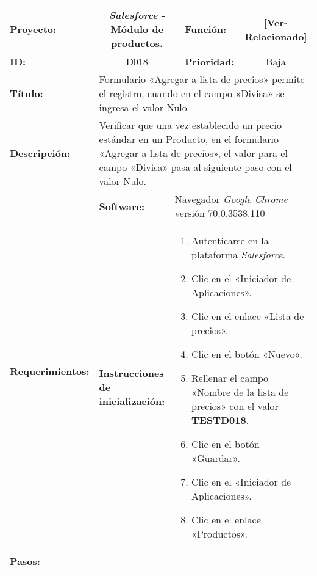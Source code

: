 \begin{table}
\renewcommand{\arraystretch}{1}
\linespread{1}
\centering
\begin{tabular}{|p{2.5cm}|p{2.8cm}|p{2.2cm}|p{2.8cm}|p{2.2cm}|}
\hline
\footnotesize{\textbf{Proyecto:}} &
\multicolumn{2}{c|}{\footnotesize{\emph{Salesforce} - Módulo de productos.}} &
\footnotesize{\textbf{Función:}} &
\multicolumn{1}{c|}{\footnotesize{[Ver-Relacionado]}} \\
\hline
\footnotesize{\textbf{ID:}} & \multicolumn{2}{c|}{\footnotesize{D018}} &
\footnotesize{\textbf{Prioridad:}} &
\multicolumn{1}{c|}{\footnotesize{Baja}} \\
\hline
\footnotesize{\textbf{Título:}} &
\multicolumn{4}{p{12.4cm}|}{\footnotesize{Formulario «Agregar a lista de
precios» permite el registro, cuando en el campo «Divisa» se ingresa
el valor Nulo}} \\
\hline
\footnotesize{\textbf{Descripción:}} &
\multicolumn{4}{p{12.4cm}|}{\footnotesize{Verificar que una vez establecido un
precio estándar en un Producto, en el formulario «Agregar a lista de precios»,
el valor para el campo «Divisa» pasa al siguiente paso con el valor
Nulo.}} \\
\hline
\multirow{2}{*}{\footnotesize{\textbf{Requerimientos:}}} &
\footnotesize{\textbf{Software:}} &
\multicolumn{3}{p{7.8cm}|}{\footnotesize{Navegador \emph{Google Chrome}
versión 70.0.3538.110}} \\
\cline{2-5}
& \footnotesize{\textbf{Instrucciones de inicialización:}} &
\multicolumn{3}{p{7.8cm}|}{\footnotesize{
\vspace{-3mm}
\begin{enumerate}
\item Autenticarse en la plataforma \emph{Salesforce}.
\item Clic en el «Iniciador de Aplicaciones».
\item Clic en el enlace «Lista de precios».
\item Clic en el botón «Nuevo».
\item Rellenar el campo «Nombre de la lista de precios» con el valor
    \textbf{TESTD018}.
\item Clic en el botón «Guardar».
\item Clic en el «Iniciador de Aplicaciones».
\item Clic en el enlace «Productos».
\end{enumerate}
\vspace{-5mm}
}} \\
\hline
\footnotesize{\textbf{Pasos:}} &

\end{tabular}
\end{table}
